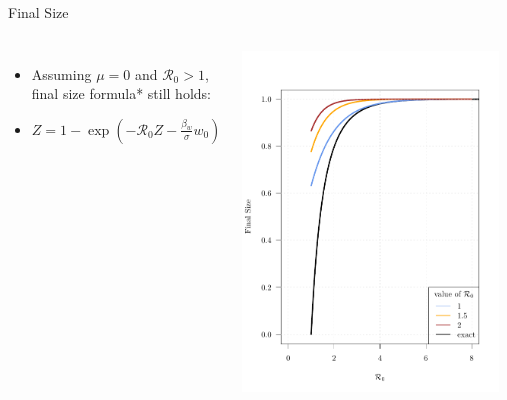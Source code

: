 \documentclass{beamer}\usepackage[]{graphicx}\usepackage[]{color}
\begin{document}
\begin{frame}{Final Size}
\begin{columns}[onlytextwidth]
\begin{itemize}
\setlength\itemsep{2em}
\item Assuming $\mu =0$ and $\mathcal R_0 > 1$, final size formula* still holds:
\item $Z = 1 - \exp{(-\mathcal R_0 Z - \frac{\beta_w}{\sigma}{w_0})}$
\end{itemize}
\includegraphics[width=0.95\textwidth]{images/finalsize.pdf}
\end{columns}
\end{frame}
\end{document}
